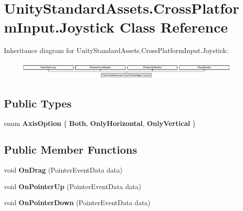 \hypertarget{class_unity_standard_assets_1_1_cross_platform_input_1_1_joystick}{}\section{Unity\+Standard\+Assets.\+Cross\+Platform\+Input.\+Joystick Class Reference}
\label{class_unity_standard_assets_1_1_cross_platform_input_1_1_joystick}
Inheritance diagram for Unity\+Standard\+Assets.\+Cross\+Platform\+Input.\+Joystick\+:\begin{figure}[H]
\begin{center}
\leavevmode
\includegraphics[height=0.945946cm]{class_unity_standard_assets_1_1_cross_platform_input_1_1_joystick}
\end{center}
\end{figure}
\subsection*{Public Types}
\begin{DoxyCompactItemize}
\item 
enum {\bfseries Axis\+Option} \{ {\bfseries Both}, 
{\bfseries Only\+Horizontal}, 
{\bfseries Only\+Vertical}
 \}\hypertarget{class_unity_standard_assets_1_1_cross_platform_input_1_1_joystick_a6d8c31bfbf3b5fb568caa04cfd87f901}{}\label{class_unity_standard_assets_1_1_cross_platform_input_1_1_joystick_a6d8c31bfbf3b5fb568caa04cfd87f901}

\end{DoxyCompactItemize}
\subsection*{Public Member Functions}
\begin{DoxyCompactItemize}
\item 
void {\bfseries On\+Drag} (Pointer\+Event\+Data data)\hypertarget{class_unity_standard_assets_1_1_cross_platform_input_1_1_joystick_a156c19bc0a3fe7a4c3b954e8c2c4a90e}{}\label{class_unity_standard_assets_1_1_cross_platform_input_1_1_joystick_a156c19bc0a3fe7a4c3b954e8c2c4a90e}

\item 
void {\bfseries On\+Pointer\+Up} (Pointer\+Event\+Data data)\hypertarget{class_unity_standard_assets_1_1_cross_platform_input_1_1_joystick_ab7f7dbe18f7b229df10dd925534b4fbf}{}\label{class_unity_standard_assets_1_1_cross_platform_input_1_1_joystick_ab7f7dbe18f7b229df10dd925534b4fbf}

\item 
void {\bfseries On\+Pointer\+Down} (Pointer\+Event\+Data data)\hypertarget{class_unity_standard_assets_1_1_cross_platform_input_1_1_joystick_a8df75692befe2a2426f6eee7a7e5765c}{}\label{class_unity_standard_assets_1_1_cross_platform_input_1_1_joystick_a8df75692befe2a2426f6eee7a7e5765c}

\end{DoxyCompactItemize}

